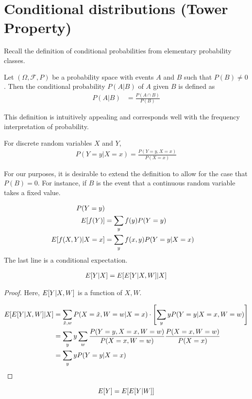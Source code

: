 \documentclass[twoside]{article}
\begin{document}
\section{Conditional distributions (Tower Property)}

Recall the definition of conditional probabilities from elementary probability
classes.

\begin{definition}
  Let $(\Omega, \mathcal F, P)$ be a probability space with events $A$ and $B$
  such that $P(B) \neq 0$.  Then the conditional probability $P(A|B)$ of $A$
  given $B$ is defined as 
  \begin{align*}
    P(A | B) &= \frac{P(A \cap B)}{P(B)} 
  \end{align*}
\end{definition}

This definition is intuitively appealing and corresponds well with the
frequency interpretation of probability.

\begin{example}
  For discrete random variables $X$ and $Y$,
  \begin{align*}
    P(Y = y | X = x) = \frac{P(Y = y, X = x)}{P(X = x)}
  \end{align*}
\end{example}

For our purposes, it is desirable to extend the definition to allow for
the case that $P(B) = 0$.  For instance, if $B$ is the event that a
continuous random variable takes a fixed value.  

\begin{align*}
  P(Y = y) \\
  E[f(Y)] &= \sum_y f(y) P(Y = y) \\
  E[f(X, Y) | X = x] &= \sum_y f(x, y) P(Y = y | X = x)
\end{align*}
The last line is a conditional expectation.

\begin{theorem}
\begin{align*}
  E[Y | X] = E[E[Y | X, W] | X]
\end{align*}
\end{theorem}
\begin{proof}
  Here, $E[Y | X, W]$ is a function of $X, W$. 

  \begin{align*}
    E[E[Y | X, W] | X] &= \sum_{\tilde{x}, w} P(X = \tilde{x}, W = w | X = x)
    \cdot \left[ \sum_y yP(Y = y | X = x, W = w)\right] \\
    &= \sum_y y \sum_w \frac{P(Y = y, X = x, W = w)}{P(X = x, W = w)}  \frac{P(X =
    x, W = w)}{P(X = x)} \\
    &= \sum_y y P(Y = y | X = x)
  \end{align*}
\end{proof}
\begin{corollary}
  \[E[Y] = E[E[Y | W]]\]
\end{corollary}
\end{document}
